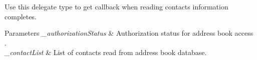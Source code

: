 Use this delegate type to get callback when reading contacts information completes. 


\begin{DoxyParams}{Parameters}
{\em \+\_\+authorization\+Status} & Authorization status for address book access .\\
\hline
{\em \+\_\+contact\+List} & List of contacts read from address book database.\\
\hline
\end{DoxyParams}

